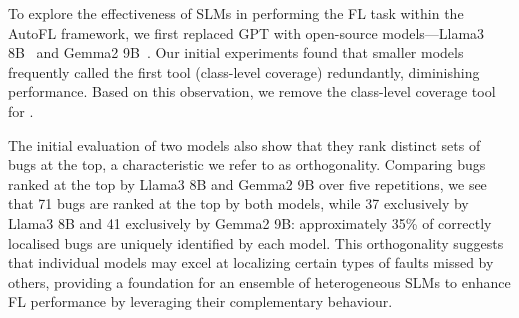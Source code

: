 To explore the effectiveness of SLMs in performing the FL task within the AutoFL framework, we first replaced GPT with open-source models—Llama3 8B~\cite{dubeyLlama3Herd2024} and Gemma2 9B~\cite{teamGemma2Improving2024}. Our initial experiments found that smaller models frequently called the first tool (class-level coverage) redundantly, diminishing performance. Based on this observation, we remove the class-level coverage tool for \cosmosfl. 



The initial evaluation of two models also show that they rank distinct sets of bugs at the top, a characteristic we refer to as orthogonality. Comparing bugs ranked at the top by Llama3 8B and Gemma2 9B over five repetitions, we see that 71 bugs are ranked at the top by both models, while 37 exclusively by Llama3 8B and 41 exclusively by Gemma2 9B: approximately 35\% of correctly localised bugs are uniquely identified by each model. This orthogonality suggests that individual models may excel at localizing certain types of faults missed by others, providing a foundation for an ensemble of heterogeneous SLMs to enhance FL performance by leveraging their complementary behaviour. 


